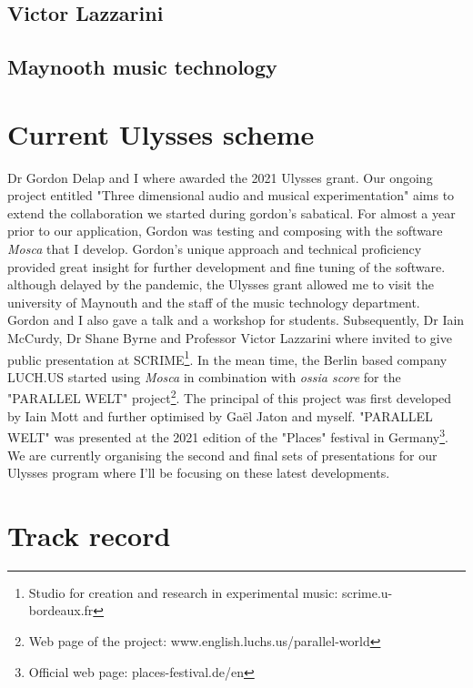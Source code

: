 \documentclass[journal,onecolumn]{IEEEtran}
\begin{document}
\subsection{Victor Lazzarini}
\subsection{Maynooth music technology}

\section{Current Ulysses scheme} %
Dr Gordon Delap and I where awarded the 2021 Ulysses grant. Our ongoing project entitled "Three dimensional audio and musical experimentation" aims to extend the collaboration we started during gordon's sabatical. For almost a year prior to our application, Gordon was testing and composing with the software \textit{Mosca}\cite{mott:mosca} that I develop. Gordon's unique approach and technical proficiency provided great insight for further development and fine tuning of the software. although delayed by the pandemic, the Ulysses grant allowed me to visit the university of Maynouth and the staff of the music technology department. Gordon and I also gave a talk and a workshop for students. Subsequently, Dr Iain McCurdy, Dr Shane Byrne and Professor Victor Lazzarini where invited to give public presentation at SCRIME\footnote{Studio for creation and research in experimental music: scrime.u-bordeaux.fr}. In the mean time, the Berlin based company LUCH.US started using \textit{Mosca} in combination with \textit{ossia score} for the "PARALLEL WELT" project\footnote{Web page of the project: www.english.luchs.us/parallel-world}. The principal of this project was first developed by Iain Mott\cite{mott:botanica} and further optimised by Gaël Jaton and myself\cite{jaton:moscanica}. "PARALLEL WELT" was presented at the 2021 edition of the "Places" festival in Germany\footnote{Official web page: places-festival.de/en}. We are currently organising the second and final sets of presentations for our Ulysses program where I'll be focusing on these latest developments.

\section{Track record}
\end{document}
